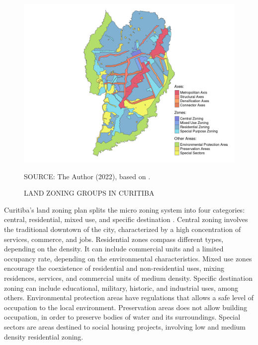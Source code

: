 \begin{figure}[!htbp]
    \centering\footnotesize
    \captionsetup{font=footnotesize}
    \caption{LAND ZONING GROUPS IN CURITIBA}
    \includegraphics{fig/zoning_map.png}
    \label{fig:zoning}
    \par SOURCE: The Author (2022), based on \textcite{IPPUC2021}.
\end{figure}


Curitiba's land zoning plan splits the micro zoning system into four categories: central, residential, mixed use, and specific destination \cite{Curitiba2019a}. Central zoning involves the traditional downtown of the city, characterized by a high concentration of services, commerce, and jobs. Residential zones compass different types, depending on the density. It can include commercial units and a limited occupancy rate, depending on the environmental characteristics. Mixed use zones encourage the coexistence of residential and non-residential uses, mixing residences, services, and commercial units of medium density. Specific destination zoning can include educational, military, historic, and industrial uses, among others. Environmental protection areas have regulations that allows a safe level of occupation to the local environment. Preservation areas does not allow building occupation, in order to preserve bodies of water and its surroundings. Special sectors are areas destined to social housing projects, involving low and medium density residential zoning. 

